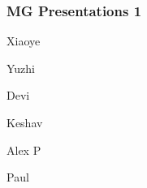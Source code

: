 \documentclass[t,12pt,numbers,fleqn]{beamer}
\begin{document}



\begin{frame}
\frametitle{MG Presentations 1}

\bi
\item Xiaoye
\item Yuzhi 
\item Devi
\item Keshav
\item Alex P
\item Paul
\ei
\end{frame}

\end{document}

